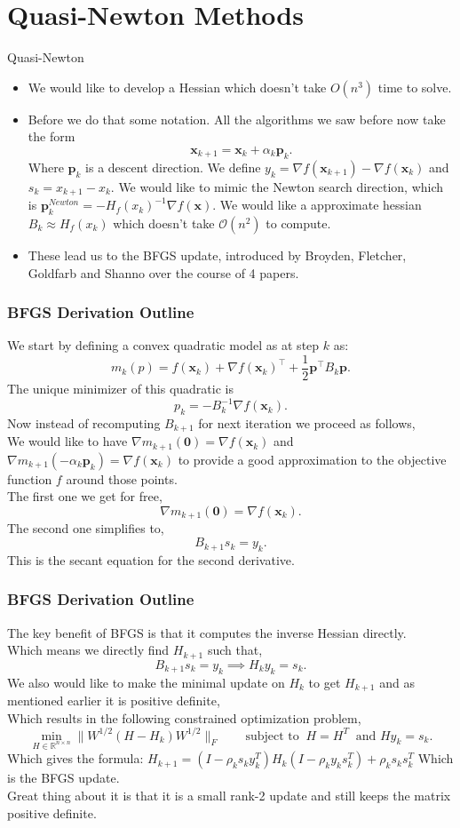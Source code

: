 \documentclass{beamer}
\begin{document}
\section{Quasi-Newton Methods}
\begin{frame}{Quasi-Newton}
	\begin{itemize}
		\item We would like to develop a Hessian which doesn't take $O(n^3)$ time to solve.
		\item Before we do that some notation. All the algorithms we saw before now take the form
		      \[
			      \bm x_{k+1} = \bm x_k + \alpha_k \bm p_k
			      .\]
		      Where $\bm p_k$ is a descent direction.
		      We define $y_k = \nabla f(\bm x_{k+1}) - \nabla f(\bm x_{k})$ and $s_{k} = x_{k+1}- x_{k}$.
		      We would like to mimic the Newton search direction, which is
		      $\bm p_k^{Newton} = -H_f(x_k)^{-1}\nabla f(\bm x)$.
		      We would like a approximate hessian $ B_k \approx H_f(x_k)$ which doesn't take $\mathcal{O}(n^2)$ to compute.
			  \item These lead us to the BFGS update, introduced by Broyden, Fletcher, Goldfarb and Shanno over the course of 4 papers.
	\end{itemize}
\end{frame}
\begin{frame}[t]
	\frametitle{BFGS Derivation Outline}
	We start by defining a convex quadratic model as at step $k$ as:
	\[
		m_{k}(p) = f(\bm x_k) + \nabla f(\bm x_{k})^\top + \frac{1}{2} \bm p^\top B_k \bm p
		.\]
	The unique minimizer of this quadratic is
	\[
		p_{k} = -B_k^{-1} \nabla f(\bm x_k)
		.\]
	Now instead of recomputing $B_{k+1}$ for next iteration we proceed as follows,\\
	We would like to have $\nabla m_{k+1}(\bm 0) = \nabla f(\bm x_k)$ and $\nabla m_{k+1}(\bm -\alpha_k \bm p_k) = \nabla f(\bm x_k)$ to provide a good approximation to the objective function $f$ around those points.\\
	The first one we get for free,
	\[
		\nabla m_{k+1}(\bm 0) = \nabla f(\bm x_k)
		.\]
	The second one simplifies to,
	\[
		B_{k+1} s_k=y_k
		.\]
	This is the secant equation for the second derivative.
\end{frame}
\begin{frame}[t]
	\frametitle{BFGS Derivation Outline}
	The key benefit of BFGS is that it computes the inverse Hessian directly.\\
	Which means we directly find $H_{k+1}$ such that,
	\[
		B_{k+1}s_k = y_k \implies H_{k}y_k = s_k
		.\]
	We also would like to make the minimal update on $H_k$ to get $H_{k+1}$ and as mentioned earlier it is positive definite, \\
	Which results in the following constrained optimization problem,
	\[
		\min_{H\in \mathbb{R}^{n\times n}} \|W^{1/2}(H-H_k)W^{1/2}\|_F \qquad \text{subject to } \: H=H^T \ \text{ and } Hy_k = s_k
		.\]
	Which gives the formula:
	$H_{k+1}=\left(I-\rho_k s_k y_k^T\right) H_k\left(I-\rho_k y_k s_k^T\right)+\rho_k s_k s_k^T$
	Which is the BFGS update.\\
	Great thing about it is that it is a small rank-2 update and still keeps the matrix positive definite.
\end{frame}
\end{document}
